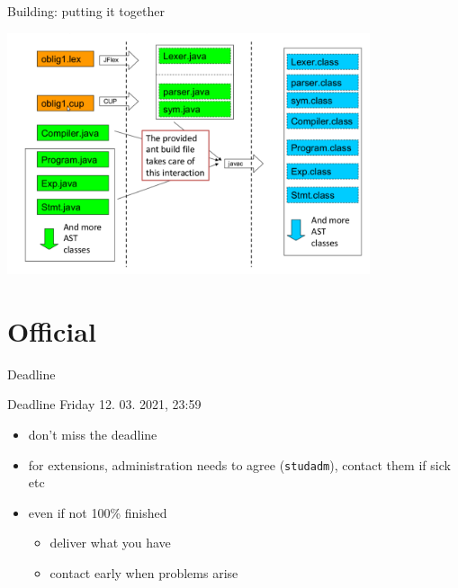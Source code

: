 \documentclass{beamer}
\begin{document}
\begin{frame}[label={sec:org2fa5bde}]{Building: putting it together}

\begin{center}
 \includegraphics[width=0.8\textwidth]{figures/snaps/buildprocess}
\end{center}
\end{frame}

\section{Official}
\label{sec:org7b95557}

\begin{frame}[label={sec:org602d1fb},fragile]{Deadline}
 \begin{alertblock}{Deadline}
\alert{Friday 12. 03. 2021, 23:59}
\end{alertblock}


\begin{itemize}
\item don't miss the deadline
\item for extensions, administration needs to agree (\texttt{studadm}), contact them
if sick etc
\item even if not 100\% finished
\begin{itemize}
\item deliver what you have
\item contact early when problems arise
\end{itemize}
\end{itemize}
\end{frame}
\end{document}
